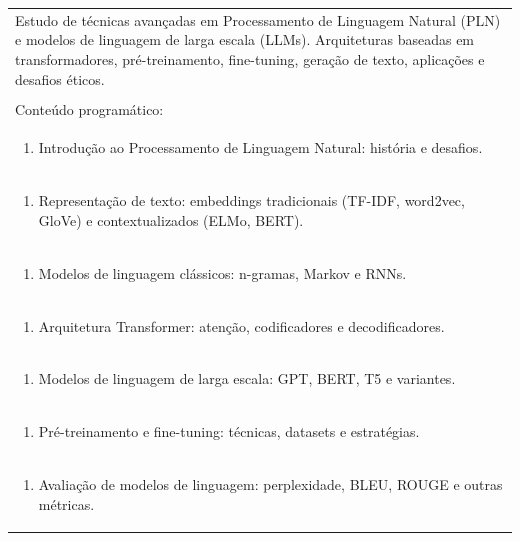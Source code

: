\documentclass[11pt]{article}
\begin{document}
\begin{center}
\begin{longtable}{|p{4cm}|p{4cm}|p{4cm}|p{4cm}|}
\multicolumn{4}{|p{\dimexpr 16cm + 6\tabcolsep\relax}|}{Estudo de técnicas avançadas em Processamento de Linguagem Natural (PLN) e modelos de linguagem de larga escala (LLMs). Arquiteturas baseadas em transformadores, pré-treinamento, fine-tuning, geração de texto, aplicações e desafios éticos.}\\
\multicolumn{4}{|p{16cm}|}{}\\
\hline
\multicolumn{4}{|p{16cm}|}{Conteúdo programático:}\\*
\multicolumn{4}{|p{\dimexpr 16cm + 6\tabcolsep\relax}|}{\begin{enumerate}[start=1]\item Introdução ao Processamento de Linguagem Natural: história e desafios.\end{enumerate}}\\
\multicolumn{4}{|p{\dimexpr 16cm + 6\tabcolsep\relax}|}{\begin{enumerate}[start=2]\item Representação de texto: embeddings tradicionais (TF-IDF, word2vec, GloVe) e contextualizados (ELMo, BERT).\end{enumerate}}\\
\multicolumn{4}{|p{\dimexpr 16cm + 6\tabcolsep\relax}|}{\begin{enumerate}[start=3]\item Modelos de linguagem clássicos: n-gramas, Markov e RNNs.\end{enumerate}}\\
\multicolumn{4}{|p{\dimexpr 16cm + 6\tabcolsep\relax}|}{\begin{enumerate}[start=4]\item Arquitetura Transformer: atenção, codificadores e decodificadores.\end{enumerate}}\\
\multicolumn{4}{|p{\dimexpr 16cm + 6\tabcolsep\relax}|}{\begin{enumerate}[start=5]\item Modelos de linguagem de larga escala: GPT, BERT, T5 e variantes.\end{enumerate}}\\
\multicolumn{4}{|p{\dimexpr 16cm + 6\tabcolsep\relax}|}{\begin{enumerate}[start=6]\item Pré-treinamento e fine-tuning: técnicas, datasets e estratégias.\end{enumerate}}\\
\multicolumn{4}{|p{\dimexpr 16cm + 6\tabcolsep\relax}|}{\begin{enumerate}[start=7]\item Avaliação de modelos de linguagem: perplexidade, BLEU, ROUGE e outras métricas.\end{enumerate}}\\

\end{longtable}
\end{center}
\end{document}
